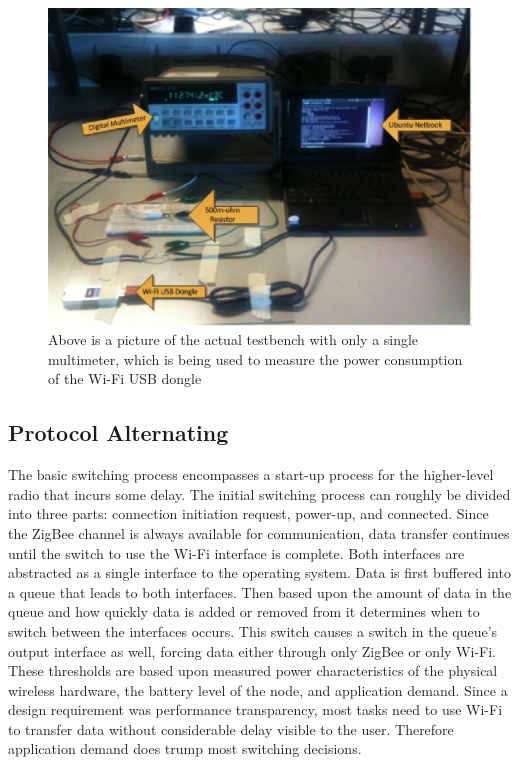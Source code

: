 \documentclass[conference]{IEEEtran}
\begin{document}
\begin{figure}
\begin{center}
\includegraphics[scale=0.50]{actual_testbench.eps}
\caption{Above is a picture of the actual testbench with only a single multimeter, which is being used to measure the power consumption of the Wi-Fi USB dongle}
\end{center}
\end{figure}

\subsection{Protocol Alternating}
The basic switching process encompasses a start-up process for the higher-level radio that incurs some delay.  The initial switching process can roughly be divided into three parts: connection initiation request, power-up, and connected.  Since the ZigBee channel is always available for communication, data transfer continues until the switch to use the Wi-Fi interface is complete.  Both interfaces are abstracted as a single interface to the operating system.  Data is first buffered into a queue that leads to both interfaces.  Then based upon the amount of data in the queue and how quickly data is added or removed from it determines when to switch between the interfaces occurs.  This switch causes a switch in the queue’s output interface as well, forcing data either through only ZigBee or only Wi-Fi.  These thresholds are based upon measured power characteristics of the physical wireless hardware, the battery level of the   node, and application demand.  Since a design requirement was performance transparency, most tasks need to use Wi-Fi to transfer data without considerable delay visible to the user.  Therefore application demand does trump most switching decisions.
\end{document}
